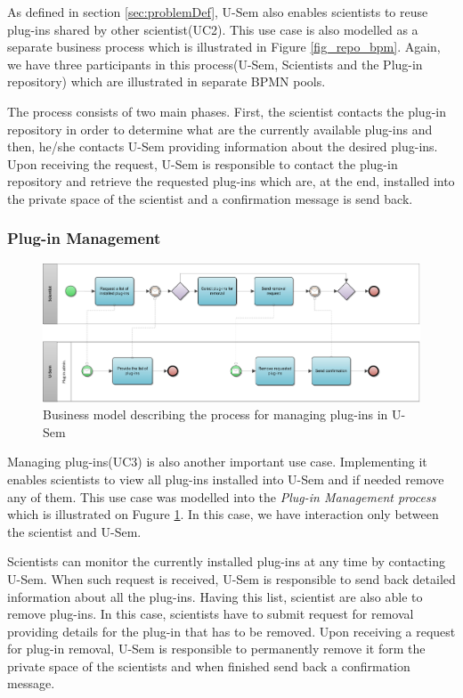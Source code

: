 As defined in section \ref{sec:problemDef}, U-Sem also enables scientists to reuse plug-ins shared by other scientist(UC2). This use case is also modelled as a separate business process which is illustrated in Figure \ref{fig_repo_bpm}. Again, we have three participants in this process(U-Sem, Scientists and the Plug-in repository) which are illustrated in separate BPMN pools. 

The process consists of two main phases. First, the scientist contacts the plug-in repository in order to determine what are the currently available plug-ins and then, he/she contacts U-Sem providing information about the desired plug-ins. Upon receiving the request, U-Sem is responsible to contact the plug-in repository and retrieve the requested plug-ins which are, at the end, installed into the private space of the scientist and a confirmation message is send back.

\subsubsection{Plug-in Management}

\begin{figure}[h!]
  \centering
  	\includegraphics[scale=0.7,angle=90]{plug-in/business_processes/PluginManagementBusinessModel.jpg}
  \caption{Business model describing the process for managing plug-ins in U-Sem}
  \label{fig_admin_bpm}
\end{figure}

Managing plug-ins(UC3) is also another important use case. Implementing it enables scientists to view all plug-ins installed into U-Sem and if needed remove any of them. This use case was modelled into the \textit{Plug-in Management process} which is illustrated on Fugure \ref{fig_admin_bpm}. In this case, we have interaction only between the scientist and U-Sem.

Scientists can monitor the currently installed plug-ins at any time by contacting U-Sem. When such request is received, U-Sem is responsible to send back detailed information about all the plug-ins. Having this list, scientist are also able to remove plug-ins. In this case, scientists have to submit request for removal providing details for the plug-in that has to be removed. Upon receiving a request for plug-in removal, U-Sem is responsible to permanently remove it form the private space of the scientists and when finished send back a confirmation message.


